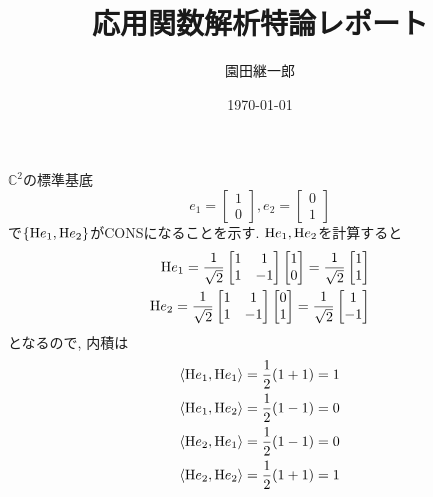 \documentclass[a4paper,11pt]{jsarticle}
\begin{document}
\title{応用関数解析特論レポート}
\author{園田継一郎}
\date{\today}
\maketitle

\section{}
$\mathbb{C}^2$の標準基底
\[
  e_1 = \begin{bmatrix}
    1 \\ 0
  \end{bmatrix}, 
  e_2 = \begin{bmatrix}
    0 \\ 1
  \end{bmatrix}
\]
で$\{{\rm H}e_1, {\rm H}e_2\}$がCONSになることを示す.
${\rm H}e_1, {\rm H}e_2$を計算すると
\begin{eqnarray*}
  {\rm H}e_1 = \frac{1}{\sqrt{2}} \begin{bmatrix}
    1 & 1 \\ 1 & -1
  \end{bmatrix} \begin{bmatrix}
    1 \\ 0
  \end{bmatrix} = \frac{1}{\sqrt{2}} \begin{bmatrix}
    1 \\ 1
  \end{bmatrix} \\
  {\rm H}e_2 = \frac{1}{\sqrt{2}} \begin{bmatrix}
    1 & 1 \\ 1 & -1
  \end{bmatrix} \begin{bmatrix}
    0 \\ 1
  \end{bmatrix} = \frac{1}{\sqrt{2}} \begin{bmatrix}
    1 \\ -1
  \end{bmatrix}
\end{eqnarray*}
となるので, 内積は
\begin{eqnarray*}
  \braket{{\rm H}e_1, {\rm H}e_1}
  = \frac{1}{2}(1 + 1) = 1 \\
  \braket{{\rm H}e_1, {\rm H}e_2}
  = \frac{1}{2}(1 - 1) = 0 \\
  \braket{{\rm H}e_2, {\rm H}e_1}
  = \frac{1}{2}(1 - 1) = 0 \\
  \braket{{\rm H}e_2, {\rm H}e_2}
  = \frac{1}{2}(1 + 1) = 1 \\
\end{eqnarray*}
\end{document}
